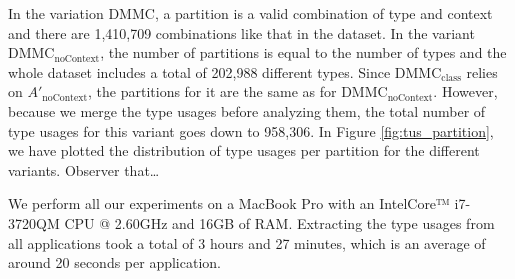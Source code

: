 In the variation $\text{DMMC}$, a partition is a valid combination of type and context and there are 1,410,709 combinations like that in the dataset.
In the variant $\text{DMMC}_{\text{noContext}}$, the number of partitions is equal to the number of types and the whole dataset includes a total of 202,988 different types.
Since $\text{DMMC}_{\text{class}}$ relies on $A'_\text{noContext}$, the partitions for it are the same as for $\text{DMMC}_{\text{noContext}}$.
However, because we merge the type usages before analyzing them, the total number of type usages for this variant goes down to 958,306.
In Figure \ref{fig:tus_partition}, we have plotted the distribution of type usages per partition for the different variants.
Observer that\ldots 
{}


We perform all our experiments on a MacBook Pro with an Intel\textregistered Core™ i7-3720QM CPU @ 2.60GHz and 16GB of RAM\@.
Extracting the type usages from all applications took a total of 3 hours and 27 minutes, which is an average of around 20 seconds per application.

